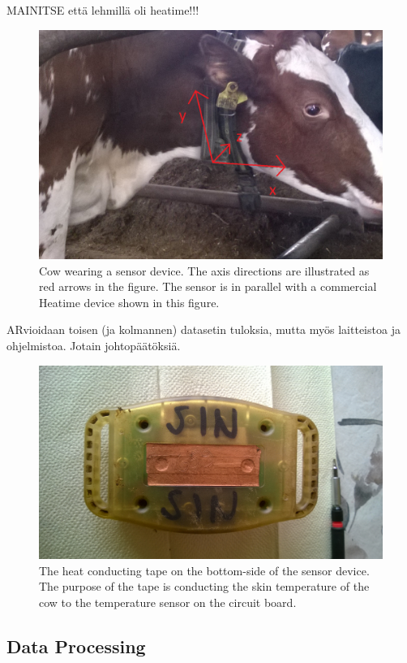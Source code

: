 \documentclass[english,12pt,a4paper,pdftex,elec,utf8]{aaltothesis}
\begin{document}
MAINITSE että lehmillä oli heatime!!!

\begin{figure}[thb]
\centering
\includegraphics[width = 0.75 \textwidth]{figures/sensorikaulassa1.png}
\caption{Cow wearing a sensor device. The axis directions are illustrated as red arrows in the figure. The sensor is in parallel with a commercial Heatime device shown in this figure.}\label{sensorikaulassakuva}
\end{figure}

ARvioidaan toisen (ja kolmannen) datasetin tuloksia, mutta myös laitteistoa ja ohjelmistoa. Jotain johtopäätöksiä.

\begin{figure}[thb]
\centering
\includegraphics[width = 0.75 \textwidth]{figures/heatConductingTape.jpg}
\caption{The heat conducting tape on the bottom-side of the sensor device. The purpose of the tape is conducting the skin temperature of the cow to the temperature sensor on the circuit board.}\label{heatconductingtape}
\end{figure}

\subsection{Data Processing} \label{dataprocessingsection}
\end{document}
